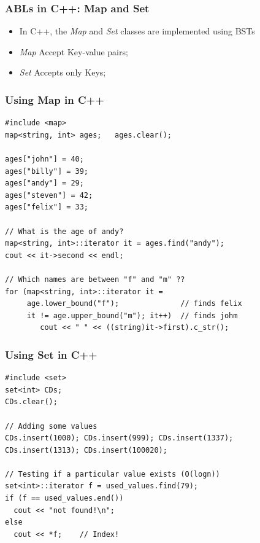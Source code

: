 \documentclass{beamer}
\begin{document}
\begin{frame}
  \frametitle{ABLs in C++: Map and Set}

  \begin{itemize}
  \item In C++, the \emph{Map} and \emph{Set} classes are implemented
    using BSTs
  \item \emph{Map} Accept Key-value pairs;
  \item \emph{Set} Accepts only Keys;
  \end{itemize}

\end{frame}

\begin{frame}[fragile]
  \frametitle{Using Map in C++}
  {\small
\begin{verbatim}
#include <map>
map<string, int> ages;   ages.clear();

ages["john"] = 40;
ages["billy"] = 39;
ages["andy"] = 29;
ages["steven"] = 42;
ages["felix"] = 33;

// What is the age of andy?
map<string, int>::iterator it = ages.find("andy");
cout << it->second << endl;

// Which names are between "f" and "m" ??
for (map<string, int>::iterator it =
     age.lower_bound("f");              // finds felix
     it != age.upper_bound("m"); it++)  // finds johm
        cout << " " << ((string)it->first).c_str();
\end{verbatim}}
\end{frame}


\begin{frame}[fragile]
  \frametitle{Using Set in C++}
  {\small
\begin{verbatim}
#include <set>
set<int> CDs;
CDs.clear();

// Adding some values
CDs.insert(1000); CDs.insert(999); CDs.insert(1337);
CDs.insert(1313); CDs.insert(100020);

// Testing if a particular value exists (O(logn))
set<int>::iterator f = used_values.find(79);
if (f == used_values.end())
  cout << "not found!\n";
else
  cout << *f;    // Index!
\end{verbatim}}
\end{frame}
\end{document}
